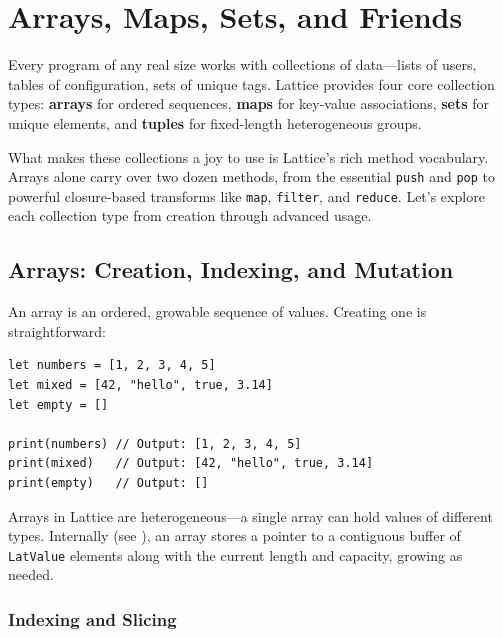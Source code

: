 \chapter{Arrays, Maps, Sets, and Friends}\label{ch:collections}


Every program of any real size works with collections of data---lists of users, tables of configuration, sets of unique tags. Lattice provides four core collection types: \textbf{arrays} for ordered sequences, \textbf{maps} for key-value associations, \textbf{sets} for unique elements, and \textbf{tuples} for fixed-length heterogeneous groups.

What makes these collections a joy to use is Lattice's rich method vocabulary. Arrays alone carry over two dozen methods, from the essential \lstinline|push| and \lstinline|pop| to powerful closure-based transforms like \lstinline|map|, \lstinline|filter|, and \lstinline|reduce|. Let's explore each collection type from creation through advanced usage.

\section{Arrays: Creation, Indexing, and Mutation}\label{sec:arrays}

An array is an ordered, growable sequence of values. Creating one is straightforward:

\begin{lstlisting}[language=Lattice, caption={Creating arrays}]
let numbers = [1, 2, 3, 4, 5]
let mixed = [42, "hello", true, 3.14]
let empty = []

print(numbers) // Output: [1, 2, 3, 4, 5]
print(mixed)   // Output: [42, "hello", true, 3.14]
print(empty)   // Output: []
\end{lstlisting}

Arrays in Lattice are heterogeneous---a single array can hold values of different types. Internally (see ), an array stores a pointer to a contiguous buffer of \lstinline|LatValue| elements along with the current length and capacity, growing as needed.

\subsection{Indexing and Slicing}\label{sec:array-indexing}

